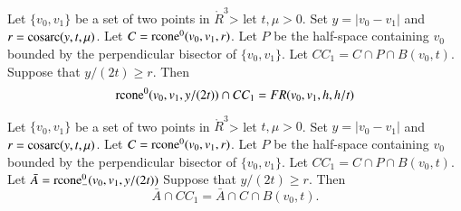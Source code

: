 \begin{tarskidata}
\begin{tarski}
\begin{proved}
\swallowed\end{proved}
\end{tarski}






\begin{tarski}

\begin{lemma}
Let $\{v_0,v_1\}$ be a set of two points in $\ring{R}^3$>
let $t,\mu > 0$.  Set $y=|v_0-v_1|$
and $r={\operatorname{cosarc}}(y,t,\mu)$.
Let $C={\operatorname{rcone}}^0(v_0,v_1,r)$.
Let $P$ be the half-space containing $v_0$ bounded by
the perpendicular bisector of  $\{v_0,v_1\}$.
Let $CC_1 = C\cap P \cap B(v_0,t)$.
Suppose that $y/(2t) \ge r$.
Then
  $$
  {\operatorname{rcone}}^0(v_0,v_1,y/(2t))\cap CC_1 = FR(v_0,v_1,h,h/t)
  $$
\end{lemma}

\begin{proved}
\swallowed\end{proved}
\end{tarski}





\begin{tarski}

\begin{lemma}
Let $\{v_0,v_1\}$ be a set of two points in $\ring{R}^3$>
let $t,\mu > 0$.  Set $y=|v_0-v_1|$
and $r={\operatorname{cosarc}}(y,t,\mu)$.
Let $C={\operatorname{rcone}}^0(v_0,v_1,r)$.
Let $P$ be the half-space containing $v_0$ bounded by
the perpendicular bisector of  $\{v_0,v_1\}$.
Let $CC_1 = C\cap P \cap B(v_0,t)$.
Let $\bar A = {\operatorname{rcone}}^0_-(v_0,v_1,y/(2t))$
Suppose that $y/(2t) \ge r$.
Then
  $$
  \bar A \cap CC_1 = \bar A \cap C \cap B(v_0,t).
  $$
\end{lemma}

\begin{proved}
\swallowed\end{proved}
\end{tarski}






\end{tarskidata}
